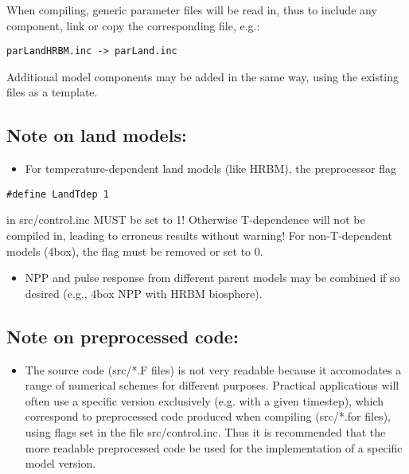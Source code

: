 \documentclass[11pt]{article}
\begin{document}
When compiling, generic parameter files will be read in, thus to include any component, link or copy the corresponding file, e.g.:

\begin{verbatim}
parLandHRBM.inc -> parLand.inc
\end{verbatim}

Additional model components may be added in the same way, using the existing files as a template.

\subsection*{Note on land models:}
\label{sec-6-1}

\begin{itemize}
\item For temperature-dependent land models (like HRBM), the preprocessor flag
\end{itemize}

\begin{verbatim}
#define LandTdep 1
\end{verbatim}

in src/control.inc MUST be set to 1! Otherwise T-dependence will not be compiled in, leading to erroneus results without warning! For non-T-dependent models (4box), the flag must be removed or set to 0. 
\begin{itemize}
\item NPP and pulse response from different parent models may be combined if so desired (e.g., 4box NPP with HRBM biosphere).
\end{itemize}


\subsection*{Note on preprocessed code:}
\label{sec-6-2}

\begin{itemize}
\item The source code (src/*.F files) is not very readable because it accomodates a range of numerical schemes for different purposes. Practical applications will often use a specific version exclusively (e.g. with a given timestep), which correspond to preprocessed code produced when compiling (src/*.for files), using flags set in the file src/control.inc. Thus it is recommended that the more readable preprocessed code be used for the implementation of a specific model version.
\end{itemize}
\end{document}
